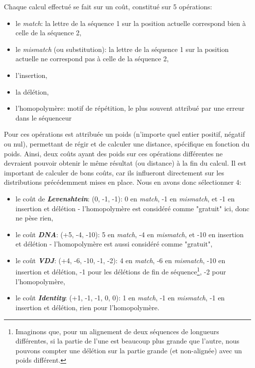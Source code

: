 \documentclass[12pt]{report}
\begin{document}
\begin{spacing}{1.2}
Chaque calcul effectué se fait sur un coût, constitué sur 5 opérations:
\begin{itemize}
\item{le \textit{match}: la lettre de la séquence 1 sur la position actuelle correspond bien à celle de la séquence 2,}
\item{le \textit{mismatch} (ou substitution): la lettre de la séquence 1 sur la position actuelle ne correspond pas à celle de la séquence 2,}
\item{l'insertion,}
\item{la délétion,}
\item{l'homopolymère: motif de répétition, le plus souvent attribué par une erreur dans le séquenceur}
\end{itemize}
Pour ces opérations est attribuée un poids (n'importe quel entier positif, négatif ou nul), permettant de régir et de calculer une distance, spécifique en fonction du poids.
\newline
Ainsi, deux coûts ayant des poids sur ces opérations différentes ne devraient pouvoir obtenir le même résultat (ou distance) à la fin du calcul.
\newline
Il est important de calculer de bons coûts, car ils influeront directement sur les distributions précédemment mises en place. Nous en avons donc sélectionner 4:
\begin{itemize}
\item{le coût de \textbf{\textit{Levenshtein}}: (0, -1, -1): 0 en \textit{match}, -1 en \textit{mismatch}, et -1 en insertion et délétion - l'homopolymère est considéré comme "gratuit" ici, donc ne pèse rien,}
\item{le coût \textbf{\textit{DNA}}: (+5, -4, -10): 5 en \textit{match}, -4 en \textit{mismatch}, et -10 en insertion et délétion - l'homopolymère est aussi considéré comme "gratuit",}
\item{le coût \textbf{\textit{VDJ}}: (+4, -6, -10, -1, -2): 4 en \textit{match}, -6 en \textit{mismatch}, -10 en insertion et délétion, -1 pour les délétions de fin de séquence\footnote{Imaginons que, pour un alignement de deux séquences de longueurs différentes, si la partie de l'une est beaucoup plus grande que l'autre, nous pouvons compter une délétion sur la partie grande (et non-alignée) avec un poids différent.}, -2 pour l'homopolymère,}
\item{le coût \textbf{\textit{Identity}}: (+1, -1, -1, 0, 0): 1 en \textit{match}, -1 en \textit{mismatch}, -1 en insertion et délétion, rien pour l'homopolymère.}
\end{itemize}


\end{spacing}
\end{document}

